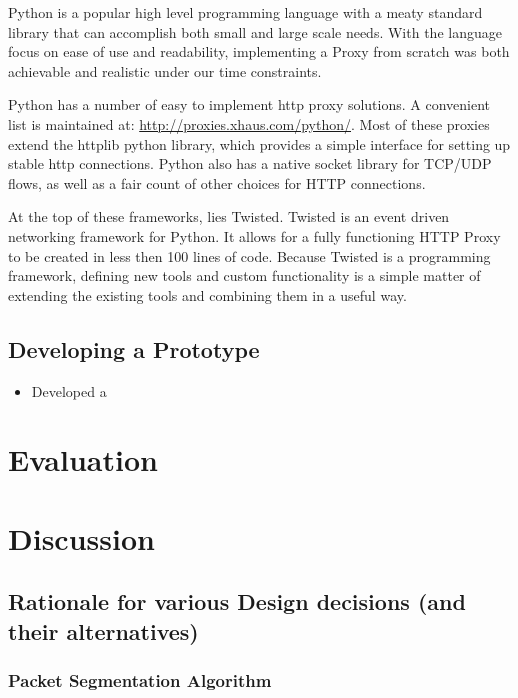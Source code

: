 \documentclass[12pt]{article}
\begin{document}
			Python is a popular high level programming language with a meaty standard library that can accomplish both small and large scale needs. With the language focus on ease of use and readability, implementing a Proxy from scratch was both achievable and realistic under our time constraints. 

			Python has a number of easy to implement http proxy solutions. A convenient list is maintained at: \url{http://proxies.xhaus.com/python/}. Most of these proxies extend the httplib python library, which provides a simple interface for setting up stable http connections. Python also has a native socket library for TCP/UDP flows, as well as a fair count of other choices for HTTP connections.
			
			At the top of these frameworks, lies Twisted. Twisted is an event driven networking framework for Python. It allows for a fully functioning HTTP Proxy to be created in less then 100 lines of code. Because Twisted is a programming framework, defining new tools and custom functionality is a simple matter of extending the existing tools and combining them in a useful way. 

			

	\subsection{Developing a Prototype}

		\begin{itemize}
			\item Developed a 
		\end{itemize}



		


\section{Evaluation}


\section{Discussion}

	\subsection{Rationale for various Design decisions (and their alternatives)}

		\subsubsection{Packet Segmentation Algorithm}
\end{document}
